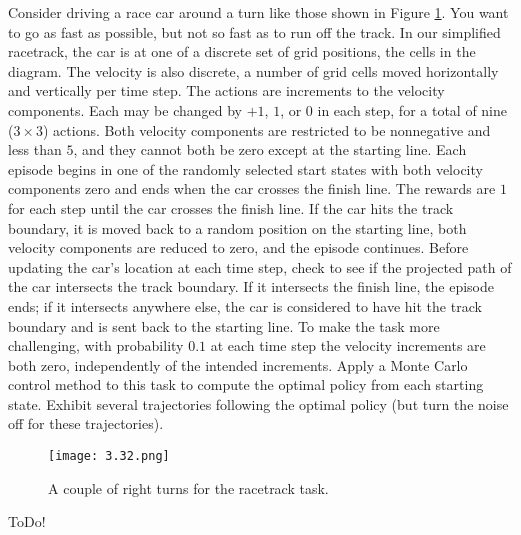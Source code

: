
\begin{exercise}

Consider driving a race car around a turn like those shown in Figure \ref{fig:4.32}.
You want to go as fast as possible, but not so fast as to run off the track.
In our simplified racetrack, the car is at one of a discrete set of grid positions, the cells in the diagram.
The velocity is also discrete, a number of grid cells moved horizontally and vertically per time step.
The actions are increments to the velocity components.
Each may be changed by $+1$, $1$, or $0$ in each step, for a total of nine ($3 \times 3$) actions.
Both velocity components are restricted to be nonnegative and less than $5$, and they cannot both be zero except at the starting line.
Each episode begins in one of the randomly selected start states with both velocity components zero and ends when the car crosses the finish line.
The rewards are $1$ for each step until the car crosses the finish line.
If the car hits the track boundary, it is moved back to a random position on the starting line, both velocity components are reduced to zero, and the episode continues.
Before updating the car's location at each time step, check to see if the projected path of the car intersects the track boundary.
If it intersects the finish line, the episode ends;
if it intersects anywhere else, the car is considered to have hit the track boundary and is sent back to the starting line.
To make the task more challenging, with probability $0.1$ at each time step the velocity increments are both zero, independently of the intended increments.
Apply a Monte Carlo control method to this task to compute the optimal policy from each starting state.
Exhibit several trajectories following the optimal policy (but turn the noise off for these trajectories).

\setcounter{section}{5}
\setcounter{figure}{4}

\begin{figure}[H]
    \centering
    \texttt{[image: 3.32.png]}
    \caption{A couple of right turns for the racetrack task.}
    \label{fig:4.32}
\end{figure}

\end{exercise}


\begin{solution}

ToDo!

\end{solution}

